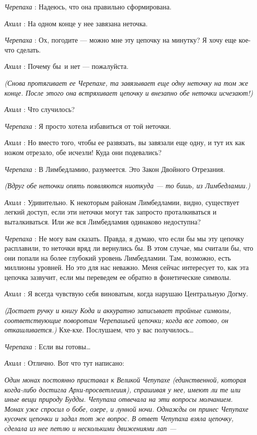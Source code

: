 \emph{Черепаха} : Надеюсь, что она правильно сформирована.

\emph{Ахилл} : На одном конце у нее завязана неточка.

\emph{Черепаха} : Ох, погодите --- можно мне эту цепочку на минутку? Я хочу еще кое-что сделать.

\emph{Ахилл} : Почему бы~и нет --- пожалуйста.

\emph{(Снова протягивает ее Черепахе, та завязывает еще одну неточку на том же конце. После этого она встряхивает цепочку и внезапно обе неточки исчезают!)}

\emph{Ахилл} : Что случилось?

\emph{Черепаха} : Я просто хотела избавиться от той неточки.

\emph{Ахилл} : Но вместо того, чтобы ее развязать, вы завязали еще одну, и тут их как ножом отрезало, обе исчезли! Куда они подевались?

\emph{Черепаха} : В Лимбедламию, разумеется. Это Закон Двойного Отрезания.

\emph{(Вдруг обе неточки опять появляются ниоткуда --- то бишь, из Лимбедламии.)}

\emph{Ахилл} : Удивительно. К некоторым районам Лимбедламии, видно, существует легкий доступ, если эти неточки могут так запросто проталкиваться и выталкиваться. Или же вся Лимбедламия одинаково недоступна?

\emph{Черепаха} : Не могу вам сказать. Правда, я думаю, что если бы мы эту цепочку расплавили, то неточки вряд ли вернулись бы. В этом случае, мы считали бы, что они попали на более глубокий уровень Лимбедламии. Там, возможно, есть миллионы уровней. Но это для нас неважно. Меня сейчас интересует то, как эта цепочка зазвучит, если мы переведем ее обратно в фонетические символы.

\emph{Ахилл} : Я всегда чувствую себя виноватым, когда нарушаю Центральную Догму.

\emph{(Достает ручку и книгу Кода и аккуратно записывает тройные символы, соответствующие поворотам Черепашьей цепочки; когда все готово, он откашливается.)} Кхе-кхе. Послушаем, что у вас получилось\ldots{}

\emph{Черепаха} : Если вы готовы\ldots{}

\emph{Ахилл} : Отлично. Вот что тут написано:

\emph{Один монах постоянно приставал к Великой Чепупахе (единственной, которая когда-либо достигла Архи-просветлеиия), спрашивая у нее, имеют ли те или иные вещи природу Будды. Чепупаха отвечала на эти вопросы молчанием. Монах уже спросил о бобе, озере, и лунной ночи. Однажды он принес Чепупахе кусочек цепочки и задал тот же вопрос. В ответ Чепупаха взяла цепочку, сделала из нее петлю и несколькими движениями лап ---}


